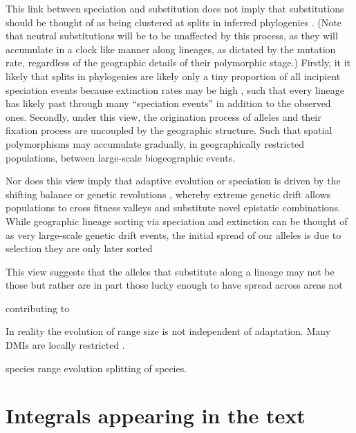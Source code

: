 \documentclass{article}
\begin{document}
This link between speciation and substitution does not imply that
substitutions should be thought of as being clustered at splits in
inferred phylogenies \citep[see ][for a recent exhange on
this]{Venditti:10, Pennell:14,Venditti:14,Pennell:14B}. 
(Note that neutral substitutions will be to be unaffected by this process, as they
will accumulate in a clock like manner along lineages, as dictated by
the mutation rate, regardless of the geographic details of their
polymorphic stage.)
Firstly, it it likely that splits in
phylogenies are likely only a tiny proportion of all incipient
speciation events because extinction rates may be high
\citep{Rosenblum:12}, such that every lineage has likely past through
many ``speciation events'' in addition to the observed ones.
Secondly, under this view, the origination process of alleles and their fixation process
are uncoupled \citep[in the sense of ][ page XXX]{Gillespiebook} by the geographic structure.
Such that spatial polymorphisms may accumulate gradually, in
geographically restricted populations, between large-scale 
biogeographic events. 
 
Nor does this view imply that adaptive evolution or speciation is driven by the
shifting balance or genetic revolutions \citep{Wright:32,
  Mayr-genetic-revol:1954}, whereby extreme genetic drift allows
populations to cross fitness valleys and substitute novel epistatic
combinations. While geographic lineage sorting via speciation and
extinction can be thought of as very large-scale genetic drift events,
the initial spread of our alleles is due to selection they are only later sorted 

This view suggests that the alleles that substitute along a lineage
may not be those but rather are in part those lucky enough to have
spread across areas not 


contributing to 


In reality the evolution of range size is not independent of
adaptation. 
Many DMIs are locally restricted \citep{Cutter:12}.

species range evolution
splitting of species.







\appendix

\section{Integrals appearing in the text}
    \label{apx:integrals}
\end{document}
